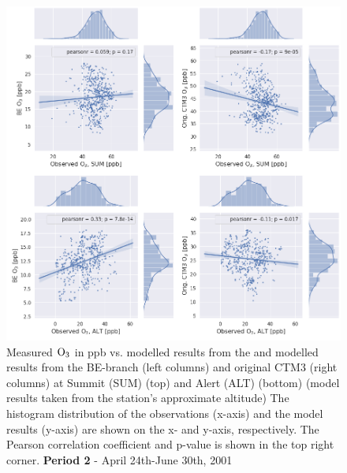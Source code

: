 \begin{figure}[ht]
    \centering
    \includegraphics[width = \linewidth]{Chapter6_Results/images/Orig_BE_comp/jointplot_AprJune_ALTSUM_O3_2001.png}
    \caption{Measured $\mathrm{O_3}$ in ppb vs. modelled results from the and modelled results from the BE-branch (left columns) and original CTM3 (right columns) at Summit (SUM) (top) and Alert (ALT) (bottom) (model results taken from the station's approximate altitude) The histogram distribution of the observations (x-axis) and the model results (y-axis) are shown on the x- and y-axis, respectively. The Pearson correlation coefficient and p-value is shown in the top right corner. \textbf{Period 2} - April 24th-June 30th, 2001}
    \label{fig:joint_AprMay_ALTSUM}
\end{figure}